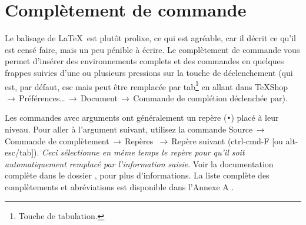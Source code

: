 \documentclass[11pt,french]{article}
\newcommand{\TS}{\textsf{\TeX Shop}}
\newcommand{\cmd}[1]{\textsf{#1}}
\newcommand{\mnu}[1]{\textsf{#1}}
\newcommand{\To}{\,\(\to\)\,}
\begin{document}




\section{Complètement de commande}\label{secCC} %

Le balisage de \LaTeX\ est plutôt prolixe, ce qui est agréable, car il décrit ce qu'il est censé faire, mais un peu pénible à écrire. Le complètement de commande vous permet d'insérer des environnements complets et des commandes en quelques frappes suivies d'une ou plusieurs pressions  sur la touche de déclenchement (qui est, par défaut, \cmd{esc} mais peut être remplacée par \cmd{tab}\footnote{Touche de tabulation.} en allant dans \mnu{TeXShop}\To\mnu{Préférences…}\To\mnu{Document}\To\mnu{Commande de complétion déclenchée par}).

Les commandes avec arguments ont généralement un repère (\texttt{•}) placé à leur niveau. Pour aller à l'argument suivant, utilisez la commande \mnu{Source}\To\mnu{Commande de complètement}\To\mnu{Repères} \To\mnu{Repère suivant} (\cmd{ctrl-cmd-F} [ou \cmd{alt-esc/tab}]). \emph{Ceci sélectionne en même temps le repère pour qu'il soit automatiquement remplacé par l'information saisie}. Voir la documentation complète dans le dossier , pour plus d'informations. La liste complète des complètements et abréviations est disponible dans l'\cmd{Annexe A} .

\end{document}
